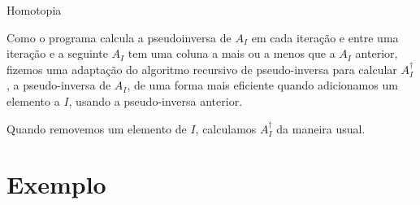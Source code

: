 \begin{algorithm}[H]
	\label{alg:homotopia}
	\caption{Homotopia}
\end{algorithm}

Como o programa calcula a pseudoinversa de $A_I$ em cada iteração e entre uma iteração e a seguinte $A_I$ tem uma coluna a mais ou a menos que a $A_I$ anterior, fizemos uma adaptação do algoritmo recursivo de pseudo-inversa \cite{greville1958pseudoinverse} para calcular $A_I^{\dagger}$, a pseudo-inversa de $A_I$, de uma forma mais eficiente quando adicionamos um elemento a $I$, usando a pseudo-inversa anterior.

Quando removemos um elemento de $I$, calculamos $A_I^{\dagger}$ da maneira usual.
\section{Exemplo}

